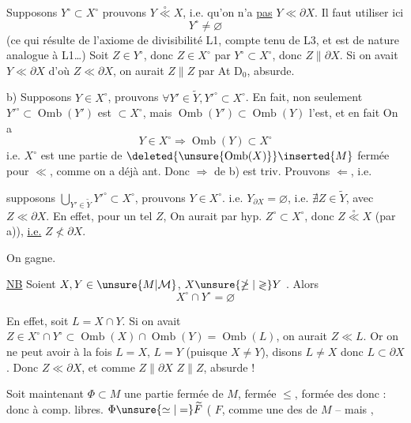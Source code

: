 Supposons $Y^\circ\subset X^\circ$ prouvons $Y\overset{\circ}{\ll}X$, i.e. qu'on n'a \uline{pas} $Y\ll\partial X$. Il faut utiliser ici
\[
\boxed{Y^\circ\ne\varnothing}
\]
(ce qui résulte de l'axiome de divisibilité L1, compte tenu de L3, et est de nature analogue à L1\ldots) Soit $Z\in Y^\circ$, donc $Z\in X^\circ$ par $Y^\circ\subset X^\circ$, donc $Z\parallel\partial X$. Si on avait $Y\ll\partial X$ d'où $Z\ll\partial X$, on aurait $Z\parallel Z$ par At D$_0$, absurde.

b) Supposons $Y\in X^\circ$, prouvons $\forall Y'\in\widetilde Y,Y'^\circ\subset X^\circ$. En  fait, non seulement $Y'^\circ\subset\operatorname{Omb}(Y')$ est $\subset X^\circ$, mais $\operatorname{Omb}(Y')\subset\operatorname{Omb}(Y)$ l'est,  et en fait  On a
\[
Y\in X^\circ\Rightarrow\operatorname{Omb}(Y)\subset X^\circ
\]
i.e. $X^\circ$ est une partie de $\deleted{\unsure{\operatorname{Omb}(X)}}\inserted{M}$ fermée pour $\ll$, comme on a  déjà ant. Donc $\Rightarrow$ de b) est triv. Prouvons $\Leftarrow$, i.e.

supposons $\displaystyle\bigcup_{Y'\in\widetilde Y}Y'^\circ\subset X^\circ$, prouvons $Y\in X^\circ$. i.e. $Y_{\partial X}=\varnothing$,  i.e. $\nexists Z\in\widetilde Y$, avec $Z\ll\partial X$. En effet, pour un tel $Z$,   On aurait par hyp. $Z^\circ\subset X^\circ$, donc $Z\overset{\circ}{\ll}X$ (par a)), \uline{i.e.} $Z\nless\partial X$.

On gagne.

\uline{NB} Soient $X,Y\in\unsure{M|\mathcal M}$, $X\unsure{\ngeq|\gtrless}Y$ . Alors
\[
X^\circ\cap Y^\circ=\varnothing
\]

En effet, soit $L=X\cap Y$. Si on avait $Z\in X^\circ\cap Y^\circ\subset\operatorname{Omb}(X)\cap\operatorname{Omb}(Y)=\operatorname{Omb}(L)$, on aurait  $Z\ll L$. Or on ne peut avoir à la fois $L=X$, $L=Y$ (puisque $X\ne Y$), disons $L\ne X$ donc $L\subset\partial X$. Donc $Z\ll\partial X$, et comme $Z\parallel\partial X$ $Z\parallel Z$, absurde !

 Soit maintenant $\Phi\subset M$ une  partie fermée de $M$, fermée  $\leq$, formée des   donc : donc à comp. libres.  $\Phi\unsure{\simeq|=}\widetilde F$ (  $F$,  comme une des  de $M$ -- mais ,

